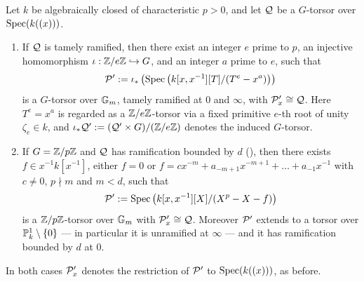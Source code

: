 \begin{lemma}\label{lemma:realization_over_Gm:reorg}
    Let $k$ be algebraically closed of characteristic $p > 0$, and let $\mathcal{Q}$ be a $G$-torsor over $\operatorname{Spec}(k((x)))$.
    \begin{enumerate}
        \item If $\mathcal{Q}$ is tamely ramified, then there exist an integer $e$ prime to $p$, an injective homomorphism
        $\iota : \mathbb{Z}/e\mathbb{Z} \hookrightarrow G$, and an integer $a$ prime to $e$, such that
        $$\mathcal{P}' := \iota_*\left( \operatorname{Spec}\left(k[x, x^{-1}][T]/(T^e - x^a)\right) \right)$$
        is a $G$-torsor over $\mathbb{G}_m$, tamely ramified at $0$ and $\infty$, with $\mathcal{P}'_x \cong \mathcal{Q}$.
        Here $T^e = x^a$ is regarded as a $\mathbb{Z}/e\mathbb{Z}$-torsor via a fixed primitive $e$-th root of unity $\zeta_e \in k$, and
        $\iota_* \mathcal{Q}' := (\mathcal{Q}' \times G)/(\mathbb{Z}/e\mathbb{Z})$ denotes the induced $G$-torsor.
        \item If $G = \mathbb{Z}/p\mathbb{Z}$ and $\mathcal{Q}$ has ramification bounded by $d$ (),
        then there exists $f \in x^{-1}k[x^{-1}]$, either $f = 0$ or
        $f = cx^{-m} + a_{-m+1}x^{-m+1} + \dots + a_{-1}x^{-1}$ with $c \neq 0$, $p \nmid m$ and $m < d$, such that
        $$\mathcal{P}' := \operatorname{Spec}\left(k[x, x^{-1}][X]/(X^p - X - f)\right)$$
        is a $\mathbb{Z}/p\mathbb{Z}$-torsor over $\mathbb{G}_m$ with $\mathcal{P}'_x \cong \mathcal{Q}$. Moreover $\mathcal{P}'$ extends to a torsor over
        $\mathbb{P}^1_k \setminus \{0\}$ --- in particular it is unramified at $\infty$ --- and it has ramification bounded by $d$
        at $0$.
    \end{enumerate}
    In both cases $\mathcal{P}'_x$ denotes the restriction of $\mathcal{P}'$ to $\operatorname{Spec}(k((x)))$, as before.
\end{lemma}
